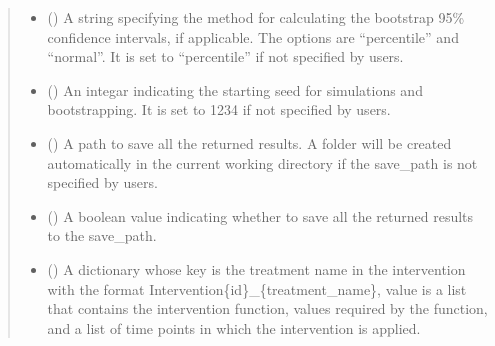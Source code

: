 \documentclass[letterpaper,10pt,english]{sphinxmanual}
\begin{document}
\begin{fulllineitems}
\begin{quote}
\begin{description}
\begin{itemize}
\item {} 
\sphinxAtStartPar
{} (\sphinxstyleliteralemphasis{\sphinxupquote{, }}) \textendash{} A string specifying the method for calculating the bootstrap 95\% confidence intervals, if applicable.
The options are “percentile” and “normal”. It is set to “percentile” if not specified by users.

\item {} 
\sphinxAtStartPar
{} (\sphinxstyleliteralemphasis{\sphinxupquote{, }}) \textendash{} An integar indicating the starting seed for simulations and bootstrapping. It is set to 1234 if not specified by users.

\item {} 
\sphinxAtStartPar
{} (\sphinxstyleliteralemphasis{\sphinxupquote{, }}) \textendash{} A path to save all the returned results. A folder will be created automatically in the current working directory
if the save\_path is not specified by users.

\item {} 
\sphinxAtStartPar
{} (\sphinxstyleliteralemphasis{\sphinxupquote{, }}) \textendash{} A boolean value indicating whether to save all the returned results to the save\_path.

\item {} 
\sphinxAtStartPar
{} (\sphinxstyleliteralemphasis{\sphinxupquote{, }}) \textendash{} A dictionary whose key is the treatment name in the intervention with the format Intervention\{id\}\_\{treatment\_name\},
value is a list that contains the intervention function, values required by the function, and a list of time
points in which the intervention is applied.

\end{itemize}

\end{description}\end{quote}

\end{fulllineitems}
\end{document}

